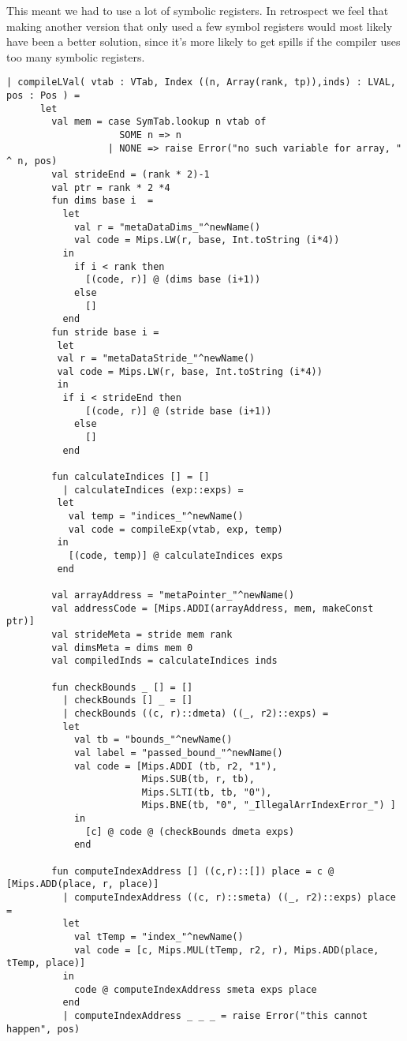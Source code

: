 This meant we had to use a lot of symbolic registers. In retrospect we feel that making another version that only used a few symbol 
registers would most likely have been a better solution, since it's more likely to get spills if the compiler uses too many symbolic registers. 
\begin{lstlisting}[style=MLStyle]
	| compileLVal( vtab : VTab, Index ((n, Array(rank, tp)),inds) : LVAL, pos : Pos ) =
      let 
        val mem = case SymTab.lookup n vtab of 
                    SOME n => n
                  | NONE => raise Error("no such variable for array, " ^ n, pos)
        val strideEnd = (rank * 2)-1
        val ptr = rank * 2 *4
        fun dims base i  = 
          let
            val r = "metaDataDims_"^newName()
            val code = Mips.LW(r, base, Int.toString (i*4))
          in
            if i < rank then
              [(code, r)] @ (dims base (i+1))
            else
              []
          end
        fun stride base i =
         let
         val r = "metaDataStride_"^newName() 
         val code = Mips.LW(r, base, Int.toString (i*4))
         in
          if i < strideEnd then
              [(code, r)] @ (stride base (i+1))
            else
              []
          end

        fun calculateIndices [] = []
          | calculateIndices (exp::exps) =
         let 
           val temp = "indices_"^newName()
           val code = compileExp(vtab, exp, temp)
         in
           [(code, temp)] @ calculateIndices exps
         end

        val arrayAddress = "metaPointer_"^newName()
        val addressCode = [Mips.ADDI(arrayAddress, mem, makeConst ptr)]
        val strideMeta = stride mem rank          
        val dimsMeta = dims mem 0 
        val compiledInds = calculateIndices inds

        fun checkBounds _ [] = []
          | checkBounds [] _ = []
          | checkBounds ((c, r)::dmeta) ((_, r2)::exps) =
          let
            val tb = "bounds_"^newName()
            val label = "passed_bound_"^newName()
            val code = [Mips.ADDI (tb, r2, "1"), 
                        Mips.SUB(tb, r, tb), 
                        Mips.SLTI(tb, tb, "0"), 
                        Mips.BNE(tb, "0", "_IllegalArrIndexError_") ]
            in
              [c] @ code @ (checkBounds dmeta exps)
            end

        fun computeIndexAddress [] ((c,r)::[]) place = c @ [Mips.ADD(place, r, place)] 
          | computeIndexAddress ((c, r)::smeta) ((_, r2)::exps) place =
          let
            val tTemp = "index_"^newName()
            val code = [c, Mips.MUL(tTemp, r2, r), Mips.ADD(place, tTemp, place)] 
          in
            code @ computeIndexAddress smeta exps place
          end
          | computeIndexAddress _ _ _ = raise Error("this cannot happen", pos)


\end{lstlisting}
